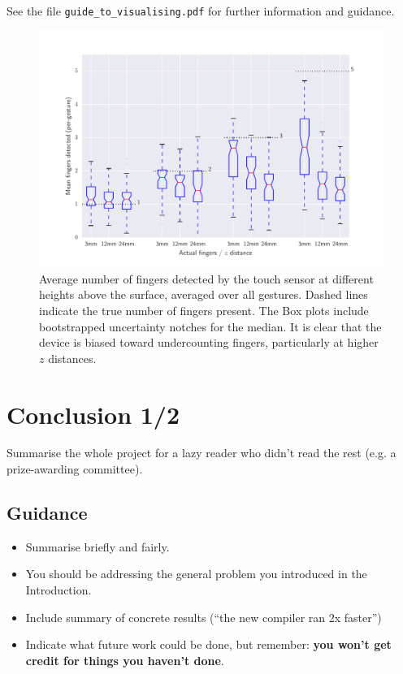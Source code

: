\documentclass{l4proj}
\begin{document}
See the file \texttt{guide\_to\_visualising.pdf} for further information and guidance.

\begin{figure}
    \centering
    \includegraphics[width=1.0\linewidth]{images/boxplot_finger_distance.pdf}    

    \caption{Average number of fingers detected by the touch sensor at different heights above the surface, averaged over all gestures. Dashed lines indicate
    the true number of fingers present. The Box plots include bootstrapped uncertainty notches for the median. It is clear that the device is biased toward 
    undercounting fingers, particularly at higher $z$ distances.
    }

    \label{fig:boxplot} 
\end{figure}


\chapter{Conclusion 1/2}    
Summarise the whole project for a lazy reader who didn't read the rest (e.g. a prize-awarding committee).
\section{Guidance}
\begin{itemize}
    \item
        Summarise briefly and fairly.
    \item
        You should be addressing the general problem you introduced in the
        Introduction.        
    \item
        Include summary of concrete results (``the new compiler ran 2x
        faster'')
    \item
        Indicate what future work could be done, but remember: \textbf{you
        won't get credit for things you haven't done}.
\end{itemize}
\end{document}
